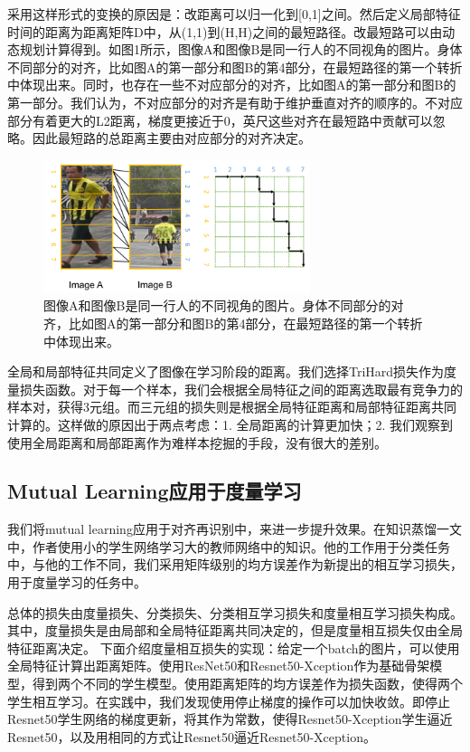 采用这样形式的变换的原因是：改距离可以归一化到[0,1]之间。然后定义局部特征时间的距离为距离矩阵D中，从(1,1)到(H,H)之间的最短路径。改最短路可以由动态规划计算得到。如图1所示，图像A和图像B是同一行人的不同视角的图片。身体不同部分的对齐，比如图A的第一部分和图B的第4部分，在最短路径的第一个转折中体现出来。同时，也存在一些不对应部分的对齐，比如图A的第一部分和图B的第一部分。我们认为，不对应部分的对齐是有助于维护垂直对齐的顺序的。不对应部分有着更大的L2距离，梯度更接近于0，英尺这些对齐在最短路中贡献可以忽略。因此最短路的总距离主要由对应部分的对齐决定。

\begin{figure}[!htbp]
\centering
\includegraphics[width=.45\linewidth,keepaspectratio]{data/waiwenfanyi/placeholder.png}
\caption{图像A和图像B是同一行人的不同视角的图片。身体不同部分的对齐，比如图A的第一部分和图B的第4部分，在最短路径的第一个转折中体现出来。}
\label{figure:placeholder}
\end{figure}

全局和局部特征共同定义了图像在学习阶段的距离。我们选择TriHard损失作为度量损失函数。对于每一个样本，我们会根据全局特征之间的距离选取最有竞争力的样本对，获得3元组。而三元组的损失则是根据全局特征距离和局部特征距离共同计算的。这样做的原因出于两点考虑：1. 全局距离的计算更加快；2. 我们观察到使用全局距离和局部距离作为难样本挖掘的手段，没有很大的差别。

\subsection{Mutual Learning应用于度量学习}

我们将mutual learning应用于对齐再识别中，来进一步提升效果。在知识蒸馏一文中，作者使用小的学生网络学习大的教师网络中的知识。他的工作用于分类任务中，与他的工作不同，我们采用矩阵级别的均方误差作为新提出的相互学习损失，用于度量学习的任务中。

总体的损失由度量损失、分类损失、分类相互学习损失和度量相互学习损失构成。其中，度量损失是由局部和全局特征距离共同决定的，但是度量相互损失仅由全局特征距离决定。
下面介绍度量相互损失的实现：给定一个batch的图片，可以使用全局特征计算出距离矩阵。使用ResNet50和Resnet50-Xception作为基础骨架模型，得到两个不同的学生模型。使用距离矩阵的均方误差作为损失函数，使得两个学生相互学习。在实践中，我们发现使用停止梯度的操作可以加快收敛。即停止Resnet50学生网络的梯度更新，将其作为常数，使得Resnet50-Xception学生逼近Resnet50，以及用相同的方式让Resnet50逼近Resnet50-Xception。

